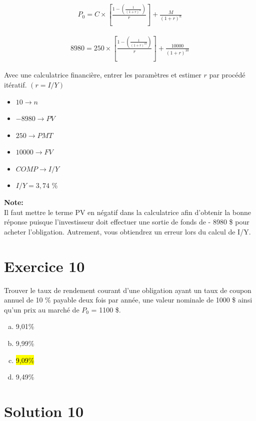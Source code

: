 \documentclass[10pt,a4paper]{article}
\begin{document}
\begin{align*}
P_0=C \times \left[\frac{1-\left( \frac{1}{(1+r)^n}\right)}{r} \right] +\frac{M}{(1+r)^n}
\end{align*}

\begin{align*}
8980=250 \times \left[\frac{1-\left( \frac{1}{(1+r)^{10}}\right)}{r} \right] +\frac{10000}{(1+r)^{10}}
\end{align*}



Avec une calculatrice financière,  entrer les paramètres et estimer $r$ par procédé itératif.  $(r=I/Y)$
\begin{itemize}
\item $10 \rightarrow n$
\item $-8980 \rightarrow PV$
\item$250 \rightarrow PMT$ 
\item $10 000 \rightarrow FV$
\item $COMP \rightarrow I/Y$
\item $ I/Y = 3,74$ \%
\end{itemize}
\textbf{Note:} \\ Il faut mettre le terme PV en négatif dans la calculatrice afin d'obtenir la bonne réponse puisque l'investisseur doit effectuer une sortie de fonds de - 8980 \$ pour acheter l'obligation. Autrement, vous obtiendrez un erreur lors du calcul de I/Y.


\newpage



\section*{Exercice 10}
Trouver le taux de rendement courant d'une obligation ayant un taux de coupon annuel de 10 \% payable deux fois par année, une valeur nominale de 1000 \$ ainsi qu'un prix au marché de $P_0$  = 1100 \$.

\begin{enumerate}[a)]
\item 9,01\%
\item 9,99\%
\item \hl{9,09\%}
\item 9,49\%
\end{enumerate}

\section*{Solution 10}
\end{document}
